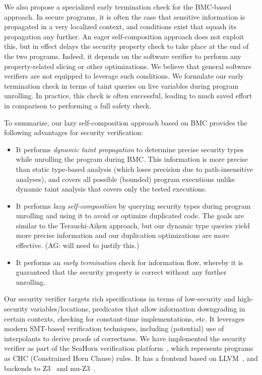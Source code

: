 We also propose a specialized early termination check for the BMC-based approach. In secure programs, it is often the case that sensitive information is propagated in a very localized context, and conditions exist that squash its propagation any further. An eager self-composition approach does not exploit this, but in effect delays the security property check to take place at the end of the two programs. Indeed, it depends on the software verifier to perform any property-related slicing or other optimizations. We believe that general software verifiers are not equipped to leverage such conditions. We formulate our early termination check in terms of taint queries on live variables during program unrolling. In practice, this check is often successful, leading to much saved effort in comparison to performing a full safety check. 

To summarize, our lazy self-composition approach based on BMC provides the following advantages for security verification:
\begin{itemize}\item It performs \emph{dynamic taint propagation} to determine precise security types while unrolling the program during BMC. This information is more precise than static type-based analysis (which loses precision due to path-insensitive analyses), and covers all possible (bounded) program executions unlike dynamic taint analysis that covers only the tested executions. 
\item It performs \emph{lazy self-composition} by querying security types during program unrolling and using it to avoid or optimize duplicated code. The goals are similar to the Terauchi-Aiken approach, but our dynamic type queries yield more precise information and our duplication optimizations are more effective. (AG: will need to justify this.)
\item It performs an \emph{early termination} check for information flow, whereby it is guaranteed that the security property is correct without any further unrolling.
\end{itemize}
Our security verifier targets rich specifications in terms of low-security and high-security variables/locations, predicates that allow information downgrading in certain contexts, checking for constant-time implementations, etc. It leverages modern SMT-based verification techniques, including (potential) use of interpolants to derive proofs of correctness. We have implemented the security verifier as part of the SeaHorn verification platform~\cite{SeahornCav15}, which represents programs as CHC (Constrained Horn Clause) rules. It has a frontend based on LLVM~\cite{llvm}, and backends to Z3~\cite{z3tool} and mu-Z3~\cite{muz3tool}.
